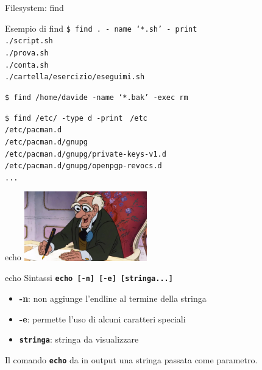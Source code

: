 \documentclass{beamer}
\begin{document}
    \begin{frame}{Filesystem: find}
        \begin{exampleblock}{Esempio di find}
            \texttt{\$ find . - name `*.sh' - print \\}
            \texttt{./script.sh \\
            ./prova.sh \\
            ./conta.sh \\
            ./cartella/esercizio/eseguimi.sh}

            \vspace{0.5cm}

            \texttt{\$ find /home/davide -name `*.bak' -exec rm {} \;}
            
            \vspace{0.5cm}

            \texttt{\$ find /etc/ -type d -print}
            \texttt{
                /etc \\
                /etc/pacman.d \\
                /etc/pacman.d/gnupg \\
                /etc/pacman.d/gnupg/private-keys-v1.d \\
                /etc/pacman.d/gnupg/openpgp-revocs.d \\
                ...
            }

        \end{exampleblock}
    \end{frame}

    \begin{frame}{echo}
        \centering
        \includegraphics[height=3cm, keepaspectratio]{images/george.png}

        \begin{block}{echo}
            Sintassi \texttt{\textbf{echo [-n] [-e] [stringa...]}}

            \begin{itemize}
                \item \textbf{-n}: non aggiunge l'endline al termine della stringa
                \item \textbf{-e}: permette l'uso di alcuni caratteri speciali
                \item \texttt{\textbf{stringa}}: stringa da visualizzare
            \end{itemize}

            Il comando \texttt{\textbf{echo}} da in output una stringa passata come parametro.
        \end{block}

        
    \end{frame}
\end{document}
